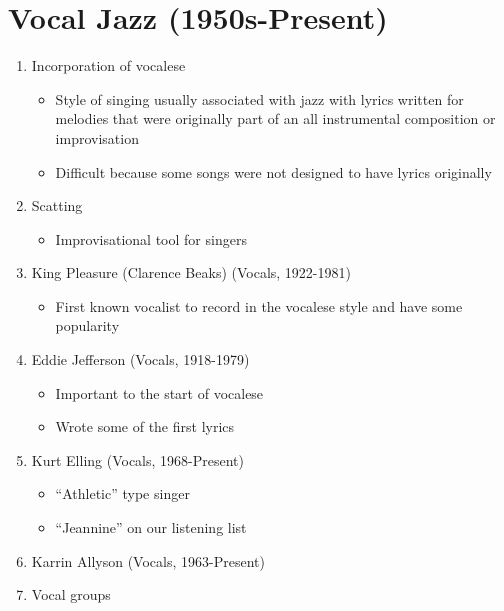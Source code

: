 \documentclass[]{article}
\providecommand{\tightlist}{%
  \setlength{\itemsep}{0pt}\setlength{\parskip}{0pt}}
\begin{document}
\section{Vocal Jazz (1950s-Present)}\label{vocal-jazz-1950s-present}

\begin{enumerate}
\def\labelenumi{\arabic{enumi}.}
\tightlist
\item
  Incorporation of vocalese

  \begin{itemize}
  \tightlist
  \item
    Style of singing usually associated with jazz with lyrics written
    for melodies that were originally part of an all instrumental
    composition or improvisation
  \item
    Difficult because some songs were not designed to have lyrics
    originally
  \end{itemize}
\item
  Scatting

  \begin{itemize}
  \tightlist
  \item
    Improvisational tool for singers
  \end{itemize}
\item
  King Pleasure (Clarence Beaks) (Vocals, 1922-1981)

  \begin{itemize}
  \tightlist
  \item
    First known vocalist to record in the vocalese style and have some
    popularity
  \end{itemize}
\item
  Eddie Jefferson (Vocals, 1918-1979)

  \begin{itemize}
  \tightlist
  \item
    Important to the start of vocalese
  \item
    Wrote some of the first lyrics
  \end{itemize}
\item
  Kurt Elling (Vocals, 1968-Present)

  \begin{itemize}
  \tightlist
  \item
    ``Athletic'' type singer
  \item
    ``Jeannine'' on our listening list
  \end{itemize}
\item
  Karrin Allyson (Vocals, 1963-Present)
\item
  Vocal groups


\end{enumerate}
\end{document}
